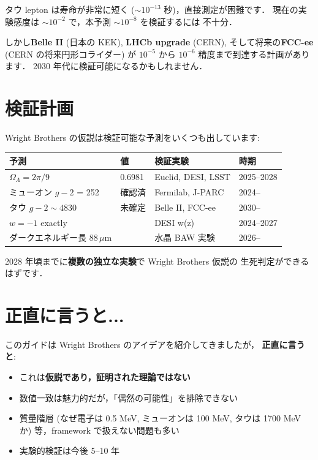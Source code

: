 \documentclass[11pt,a4paper]{article}
\begin{document}
タウ lepton は寿命が非常に短く ($\sim 10^{-13}$ 秒)，直接測定が困難です．
現在の実験感度は $\sim 10^{-2}$ で，本予測 $\sim 10^{-8}$ を検証するには
不十分．

しかし\textbf{Belle II} (日本の KEK), \textbf{LHCb upgrade} (CERN),
そして将来の\textbf{FCC-ee} (CERN の将来円形コライダー) が
$10^{-5}$ から $10^{-6}$ 精度まで到達する計画があります．
2030 年代に検証可能になるかもしれません．

\section{検証計画}

Wright Brothers の仮説は検証可能な予測をいくつも出しています:

\begin{center}
\begin{tabular}{llll}
\toprule
予測 & 値 & 検証実験 & 時期 \\
\midrule
$\Omega_\Lambda = 2\pi/9$ & 0.6981 & Euclid, DESI, LSST & 2025--2028 \\
ミューオン $g-2$ = 252 & 確認済 & Fermilab, J-PARC & 2024-- \\
タウ $g-2 \sim 4830$ & 未確定 & Belle II, FCC-ee & 2030-- \\
$w = -1$ exactly & & DESI w(z) & 2024--2027 \\
ダークエネルギー長 $88\,\mu$m & & 水晶 BAW 実験 & 2026-- \\
\bottomrule
\end{tabular}
\end{center}

2028 年頃までに\textbf{複数の独立な実験}で Wright Brothers 仮説の
生死判定ができるはずです．

\section{正直に言うと...}

このガイドは Wright Brothers のアイデアを紹介してきましたが，
\textbf{正直に言うと}:

\begin{itemize}
\item これは\textbf{仮説であり，証明された理論ではない}
\item 数値一致は魅力的だが，「偶然の可能性」を排除できない
\item 質量階層 (なぜ電子は 0.5 MeV, ミューオンは 100 MeV, タウは 1700 MeV か)
等，framework で扱えない問題も多い
\item 実験的検証は今後 5--10 年
\end{itemize}
\end{document}
